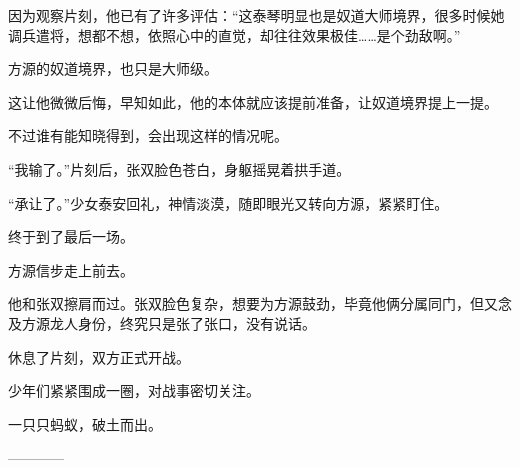 \begin{this_body}
因为观察片刻，他已有了许多评估：“这泰琴明显也是奴道大师境界，很多时候她调兵遣将，想都不想，依照心中的直觉，却往往效果极佳……是个劲敌啊。”

方源的奴道境界，也只是大师级。

这让他微微后悔，早知如此，他的本体就应该提前准备，让奴道境界提上一提。

不过谁有能知晓得到，会出现这样的情况呢。

“我输了。”片刻后，张双脸色苍白，身躯摇晃着拱手道。

“承让了。”少女泰安回礼，神情淡漠，随即眼光又转向方源，紧紧盯住。

终于到了最后一场。

方源信步走上前去。

他和张双擦肩而过。张双脸色复杂，想要为方源鼓劲，毕竟他俩分属同门，但又念及方源龙人身份，终究只是张了张口，没有说话。

休息了片刻，双方正式开战。

少年们紧紧围成一圈，对战事密切关注。

一只只蚂蚁，破土而出。

------------

\end{this_body}

